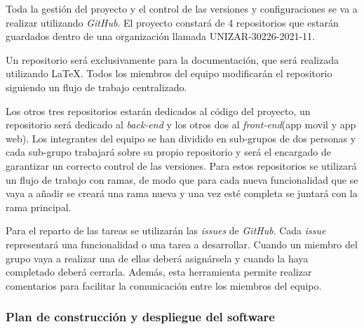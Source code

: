 \documentclass{article}
\begin{document}


Toda la gestión del proyecto y el control de las versiones y configuraciones se va a realizar utilizando \textit{GitHub}. El proyecto constará de 4 repositorios que estarán guardados dentro de una organización llamada UNIZAR-30226-2021-11.

Un repositorio será exclusivamente para la documentación, que será realizada utilizando \LaTeX. Todos los miembros del equipo modificarán el repositorio siguiendo un flujo de trabajo centralizado.

Los otros tres repositorios estarán dedicados al código del proyecto, un repositorio será dedicado al \textit{back-end} y los otros dos al \textit{front-end}(app movil y app web). Los integrantes del equipo se han dividido en sub-grupos de dos personas y cada sub-grupo trabajará sobre su propio repositorio y será el encargado de garantizar un correcto control de las versiones. Para estos repositorios se utilizará un flujo de trabajo con ramas, de modo que para cada nueva funcionalidad que se vaya a añadir se creará una rama nueva y una vez esté completa se juntará con la rama principal.

Para el reparto de las tareas se utilizarán las \textit{issues} de \textit{GitHub}. Cada \textit{issue} representará una funcionalidad o una tarea a desarrollar. Cuando un miembro del grupo vaya a realizar una de ellas deberá asignársela y cuando la haya completado deberá cerrarla. Además, esta herramienta permite realizar comentarios para facilitar la comunicación entre los miembros del equipo.

\subsubsection{Plan de construcción y despliegue del software}
\end{document}
